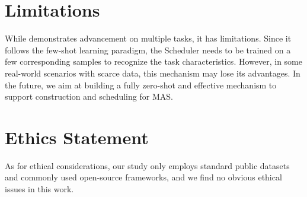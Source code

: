 \section*{Limitations}
While \ourmethod demonstrates advancement on multiple tasks, it has limitations. Since it follows the few-shot learning paradigm, the Scheduler needs to be trained on a few corresponding samples to recognize the task characteristics. However, in some real-world scenarios with scarce data, this mechanism may lose its advantages. In the future, we aim at building a fully zero-shot and effective mechanism to support construction and scheduling for MAS.

\section*{Ethics Statement}
As for ethical considerations, our study only employs standard public datasets and commonly used open-source frameworks, and we find no obvious ethical issues in this work. 


